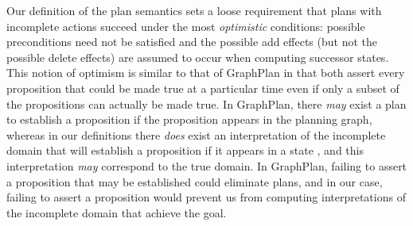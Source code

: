 \documentclass{article}
\def\citep#1{\cite{#1}} \def\citet#1{\citeA{#1}}
\def\und#1{\noindent{\bf #1}:}
\def\und#1{\medskip{\noindent\bf #1:}}
\begin{document}

  


%
%



\und{Discussion} Our definition of the plan semantics sets a loose requirement
that plans with incomplete actions succeed under the most  {\em optimistic} conditions:  possible
preconditions need not be satisfied and the possible add effects (but not the
possible delete effects) are assumed to occur when computing successor states.  
This notion of optimism is similar to that of GraphPlan \citep{graphplan} in
that  both assert every proposition that could be made true at a particular time
even if only a subset of the propositions can actually be made true.  In
GraphPlan, there {\em may} exist a plan to establish a proposition if the
proposition appears in the planning graph, whereas in our definitions there {\em
does} exist an interpretation of the incomplete domain that will establish a
proposition if it appears in a state \citep{USU-CS-TR-11-001}, and this interpretation {\em
may} correspond to the true domain. In GraphPlan, failing to assert a proposition that may be
established could eliminate plans, and in our case, failing to assert a proposition would prevent us from computing interpretations of the incomplete
domain that achieve the goal.
\end{document}
